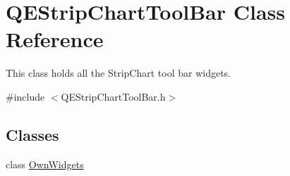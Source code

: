 \hypertarget{classQEStripChartToolBar}{
\section{QEStripChartToolBar Class Reference}
\label{classQEStripChartToolBar}
}


This class holds all the StripChart tool bar widgets.  




{\ttfamily \#include $<$QEStripChartToolBar.h$>$}

\subsection*{Classes}
\begin{DoxyCompactItemize}
\item 
class \hyperlink{classQEStripChartToolBar_1_1OwnWidgets}{OwnWidgets}
\end{DoxyCompactItemize}
